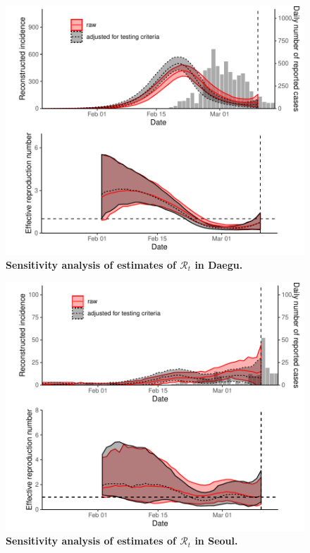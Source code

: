 \pagebreak

\begin{figure}[!ht]
\includegraphics[width=\textwidth]{figure_R_t_daegu.pdf}
\caption{
\textbf{Sensitivity analysis of estimates of $\mathcal R_t$ in Daegu.}
}
\end{figure}

\pagebreak

\begin{figure}[!ht]
\includegraphics[width=\textwidth]{figure_R_t_seoul.pdf}
\caption{
\textbf{Sensitivity analysis of estimates of $\mathcal R_t$ in Seoul.}
}
\end{figure}

